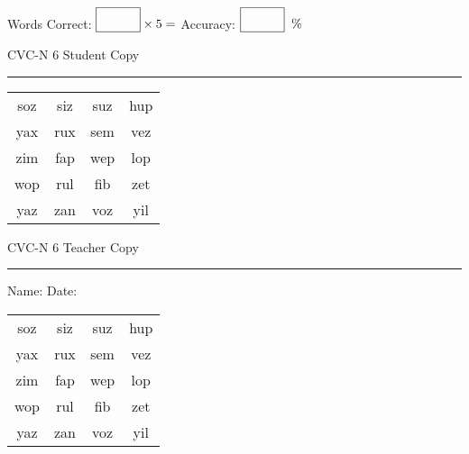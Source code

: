 \documentclass{memoir}
\begin{document}
\small

Words Correct: $\fbox{\phantom{\huge 100}} \times 5 = $ Accuracy: $\fbox{\phantom{\huge 100}}\;\; \%$ 

\vfill

\newpage


\footnotesize \noindent
CVC-N 6 \hfill Student Copy
\smallskip
\hrule

\Large

\setlength{\tabcolsep}{14pt}
\def\arraystretch{2}

{\selectfont


\begin{vplace}[0.5]
\begin{center}
\begin{tabular}{cccc}
soz & siz & suz & hup \\
yax & rux & sem & vez \\
zim & fap & wep & lop \\
wop & rul & fib & zet \\
yaz & zan & voz & yil \\
\end{tabular}
\end{center}
\end{vplace}

}

\newpage

\footnotesize \noindent
CVC-N 6 \hfill Teacher Copy
\smallskip
\hrule

\small

\vfill

\noindent
Name: \underline{\hspace{1.75in}} \hfill Date: \underline{\hspace{1in}}

\Large

{\selectfont


\begin{vplace}[0.5]
\begin{center}
\begin{tabular}{cccc}
soz & siz & suz & hup \\
yax & rux & sem & vez \\
zim & fap & wep & lop \\
wop & rul & fib & zet \\
yaz & zan & voz & yil \\
\end{tabular}
\end{center}
\end{vplace}



}
\end{document}
